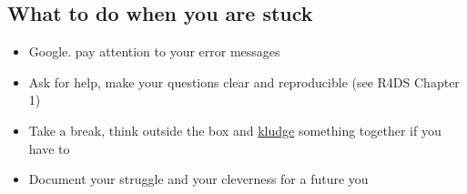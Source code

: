 \documentclass[
]{article}
\begin{document}
\hypertarget{what-to-do-when-you-are-stuck}{%
\subsection{What to do when you are
stuck}\label{what-to-do-when-you-are-stuck}}

\begin{itemize}
\item
  Google. pay attention to your error messages
\item
  Ask for help, make your questions clear and reproducible (see R4DS
  Chapter 1)
\item
  Take a break, think outside the box and
  \href{https://www.google.com/search?newwindow=1\&safe=active\&rlz=1C1SQJL_enUS782US782\&q=Dictionary\#dobs=kludge}{kludge}
  something together if you have to
\item
  Document your struggle and your cleverness for a future you
\end{itemize}
\end{document}
